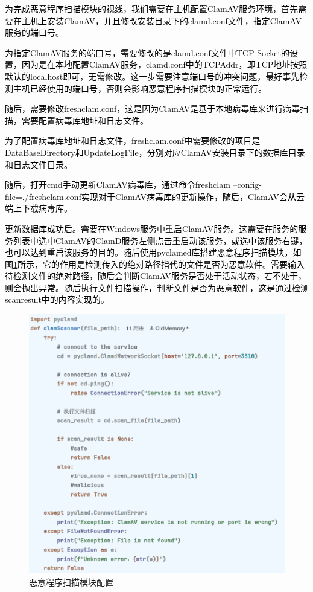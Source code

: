 \textcolor{black}{为完成恶意程序扫描模块的视线，我们需要在主机配置ClamAV服务环境，首先需要在主机上安装ClamAV，并且修改安装目录下的clamd.conf文件，指定ClamAV服务的端口号。}

\textcolor{black}{为指定ClamAV服务的端口号，需要修改的是clamd.conf文件中TCP Socket的设置，因为是在本地配置ClamAV服务，clamd.conf中的TCPAddr，即TCP地址按照默认的localhost即可，无需修改。这一步需要注意端口号的冲突问题，最好事先检测主机已经使用的端口号，否则会影响恶意程序扫描模块的正常运行。}

\textcolor{black}{随后，需要修改freshclam.conf，这是因为ClamAV是基于本地病毒库来进行病毒扫描，需要配置病毒库地址和日志文件。}

\textcolor{black}{为了配置病毒库地址和日志文件，freshclam.conf中需要修改的项目是DataBaseDirectory和UpdateLogFile，分别对应ClamAV安装目录下的数据库目录和日志文件目录。}

\textcolor{black}{随后，打开cmd手动更新ClamAV病毒库，通过命令freshclam –config-file=./freshclam.conf实现对于ClamAV病毒库的更新操作，随后，ClamAV会从云端上下载病毒库。}

\textcolor{black}{更新数据库成功后。需要在Windows服务中重启ClamAV服务。这需要在服务的服务列表中选中ClamAV的ClamD服务左侧点击重启动该服务，或选中该服务右键，也可以达到重启该服务的目的。随后使用pyclamed库搭建恶意程序扫描模块，如图\ref{fig:configuration_of_malware_scan_module}所示，它的作用是检测传入的绝对路径指代的文件是否为恶意软件。需要输入待检测文件的绝对路径，随后会判断ClamAV服务是否处于活动状态，若不处于，则会抛出异常。随后执行文件扫描操作，判断文件是否为恶意软件，这是通过检测scanresult中的内容实现的。}

\begin{figure}
  \centering
  \includegraphics[]{images/configuration_of_malware_scan_module.png}
  \caption{恶意程序扫描模块配置}\label{fig:configuration_of_malware_scan_module}
\end{figure}

